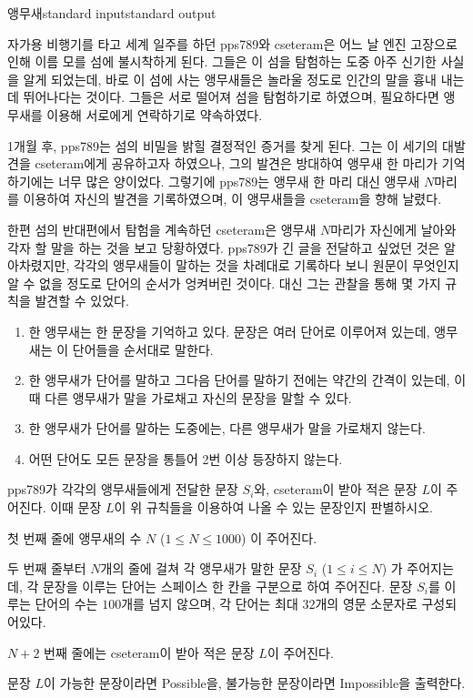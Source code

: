 \begin{problem}{앵무새}{standard input}{standard output}

자가용 비행기를 타고 세계 일주를 하던 pps789와 cseteram은 어느 날 엔진 고장으로 인해 이름 모를 섬에 불시착하게 된다. 그들은 이 섬을 탐험하는 도중 아주 신기한 사실을 알게 되었는데, 바로 이 섬에 사는 앵무새들은 놀라울 정도로 인간의 말을 흉내 내는 데 뛰어나다는 것이다. 그들은 서로 떨어져 섬을 탐험하기로 하였으며, 필요하다면 앵무새를 이용해 서로에게 연락하기로 약속하였다.

1개월 후, pps789는 섬의 비밀을 밝힐 결정적인 증거를 찾게 된다. 그는 이 세기의 대발견을 cseteram에게 공유하고자 하였으나, 그의 발견은 방대하여 앵무새 한 마리가 기억하기에는 너무 많은 양이었다. 그렇기에 pps789는 앵무새 한 마리 대신 앵무새 $N$마리를 이용하여 자신의 발견을 기록하였으며, 이 앵무새들을 cseteram을 향해 날렸다.

한편 섬의 반대편에서 탐험을 계속하던 cseteram은 앵무새 $N$마리가 자신에게 날아와 각자 할 말을 하는 것을 보고 당황하였다. pps789가 긴 글을 전달하고 싶었던 것은 알아차렸지만, 각각의 앵무새들이 말하는 것을 차례대로 기록하다 보니 원문이 무엇인지 알 수 없을 정도로 단어의 순서가 엉켜버린 것이다. 대신 그는 관찰을 통해 몇 가지 규칙을 발견할 수 있었다.

\begin{enumerate}
\item{한 앵무새는 한 문장을 기억하고 있다. 문장은 여러 단어로 이루어져 있는데, 앵무새는 이 단어들을 순서대로 말한다.}
\item{한 앵무새가 단어를 말하고 그다음 단어를 말하기 전에는 약간의 간격이 있는데, 이때 다른 앵무새가 말을 가로채고 자신의 문장을 말할 수 있다.}
\item{한 앵무새가 단어를 말하는 도중에는, 다른 앵무새가 말을 가로채지 않는다.}
\item{어떤 단어도 모든 문장을 통틀어 2번 이상 등장하지 않는다.}
\end{enumerate}

pps789가 각각의 앵무새들에게 전달한 문장 $S_i$와, cseteram이 받아 적은 문장 $L$이 주어진다. 이때 문장 $L$이 위 규칙들을 이용하여 나올 수 있는 문장인지 판별하시오.

\InputFile
첫 번째 줄에 앵무새의 수 $N$ ($1 \le N \le 1000$) 이 주어진다.

두 번째 줄부터 $N$개의 줄에 걸쳐 각 앵무새가 말한 문장 $S_i$ ($1 \le i \le N$) 가 주어지는데, 각 문장을 이루는 단어는 스페이스 한 칸을 구분으로 하여 주어진다. 문장 $S_i$를 이루는 단어의 수는 $100$개를 넘지 않으며, 각 단어는 최대 $32$개의 영문 소문자로 구성되어있다.

$N+2$ 번째 줄에는 cseteram이 받아 적은 문장 $L$이 주어진다.

\OutputFile
문장 $L$이 가능한 문장이라면 Possible을, 불가능한 문장이라면 Impossible을 출력한다.

\Example

\begin{example}
%
%
%
\end{example}

\end{problem}
